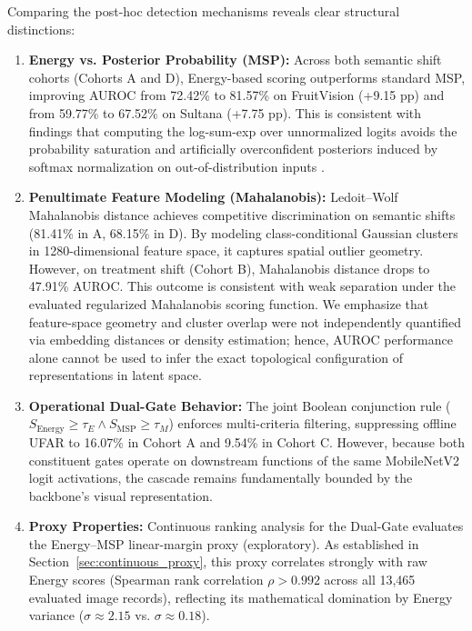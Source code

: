Comparing the post-hoc detection mechanisms reveals clear structural distinctions:
\begin{enumerate}
\setlength{\itemsep}{0pt}
\setlength{\parsep}{0pt}
\setlength{\parskip}{0pt}
\setlength{\topsep}{1pt}
\setlength{\partopsep}{0pt}
\item \textbf{Energy vs. Posterior Probability (MSP):} Across both semantic shift cohorts (Cohorts A and D), Energy-based scoring outperforms standard MSP, improving AUROC from 72.42\% to 81.57\% on FruitVision (+9.15 pp) and from 59.77\% to 67.52\% on Sultana (+7.75 pp). This is consistent with findings that computing the log-sum-exp over unnormalized logits avoids the probability saturation and artificially overconfident posteriors induced by softmax normalization on out-of-distribution inputs \cite{liu2020energy}.
\item \textbf{Penultimate Feature Modeling (Mahalanobis):} Ledoit--Wolf Mahalanobis distance achieves competitive discrimination on semantic shifts (81.41\% in A, 68.15\% in D). By modeling class-conditional Gaussian clusters in 1280-dimensional feature space, it captures spatial outlier geometry. However, on treatment shift (Cohort B), Mahalanobis distance drops to 47.91\% AUROC. This outcome is consistent with weak separation under the evaluated regularized Mahalanobis scoring function. We emphasize that feature-space geometry and cluster overlap were not independently quantified via embedding distances or density estimation; hence, AUROC performance alone cannot be used to infer the exact topological configuration of representations in latent space.
\item \textbf{Operational Dual-Gate Behavior:} The joint Boolean conjunction rule ($S_{\text{Energy}} \ge \tau_E \land S_{\text{MSP}} \ge \tau_M$) enforces multi-criteria filtering, suppressing offline UFAR to 16.07\% in Cohort A and 9.54\% in Cohort C. However, because both constituent gates operate on downstream functions of the same MobileNetV2 logit activations, the cascade remains fundamentally bounded by the backbone's visual representation.
\item \textbf{Proxy Properties:} Continuous ranking analysis for the Dual-Gate evaluates the Energy--MSP linear-margin proxy (exploratory). As established in Section~\ref{sec:continuous_proxy}, this proxy correlates strongly with raw Energy scores (Spearman rank correlation $\rho > 0.992$ across all 13,465 evaluated image records), reflecting its mathematical domination by Energy variance ($\sigma \approx 2.15$ vs. $\sigma \approx 0.18$).
\end{enumerate}

